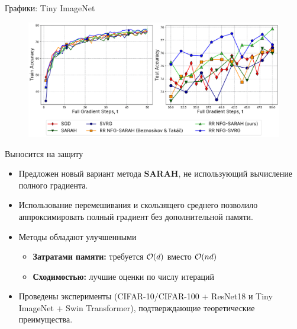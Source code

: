 \documentclass{beamer}
\theoremstyle{plain}
\begin{document}
\begin{frame}{Графики: Tiny ImageNet}
\begin{figure}
\centering
\includegraphics[width=\linewidth]{../figures/vit_results.pdf}
\end{figure}
\end{frame}


\begin{frame}{Выносится на защиту}
    \begin{itemize}
        \item Предложен новый вариант метода  \textbf{SARAH}, не использующий вычисление полного градиента.
        \item Использование перемешивания и скользящего среднего позволило аппроксимировать полный градиент без дополнительной памяти.
        \item Методы обладают улучшенными 
        \begin{itemize}
            \item \textbf{Затратами памяти:} требуется \(\order{d}\) вместо \(\order{nd}\)
            \item \textbf{Сходимостью:} лучшие оценки по числу итераций
        \end{itemize}
        \item Проведены эксперименты (CIFAR-10/CIFAR-100 + ResNet18 и Tiny ImageNet + Swin Transformer), подтверждающие теоретические преимущества.
    \end{itemize}
    \end{frame}
    

    
\end{document}
